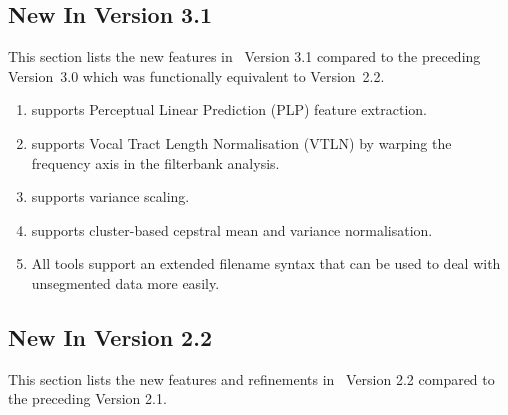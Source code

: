 \subsection{New In Version 3.1}{}

This  section lists the new
features in \HTK\ Version 3.1 compared to the preceding Version~3.0
which was functionally equivalent to Version~2.2.

\begin{enumerate}

\item {} supports Perceptual Linear Prediction (PLP) feature
  extraction.

\item {} supports Vocal Tract Length Normalisation (VTLN)
  by warping the frequency axis in the filterbank analysis.

\item {} supports variance scaling.

\item {} supports cluster-based cepstral mean and variance
  normalisation. 

\item All tools support an extended filename syntax that can be used
  to deal with unsegmented data more easily.

\end{enumerate}


\subsection{New In Version 2.2}{}

This section lists the new features and refinements in \HTK\ Version
2.2 compared to the preceding Version 2.1.
 
